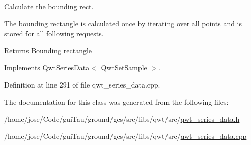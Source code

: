 Calculate the bounding rect. 

The bounding rectangle is calculated once by iterating over all points and is stored for all following requests.

\begin{DoxyReturn}{Returns}
Bounding rectangle 
\end{DoxyReturn}


Implements \hyperlink{class_qwt_series_data_aedb969ba51a27d88d26ad7f7cb1c2c7f}{Qwt\-Series\-Data$<$ Qwt\-Set\-Sample $>$}.



Definition at line 291 of file qwt\-\_\-series\-\_\-data.\-cpp.



The documentation for this class was generated from the following files\-:\begin{DoxyCompactItemize}
\item 
/home/jose/\-Code/gui\-Tau/ground/gcs/src/libs/qwt/src/\hyperlink{qwt__series__data_8h}{qwt\-\_\-series\-\_\-data.\-h}\item 
/home/jose/\-Code/gui\-Tau/ground/gcs/src/libs/qwt/src/\hyperlink{qwt__series__data_8cpp}{qwt\-\_\-series\-\_\-data.\-cpp}\end{DoxyCompactItemize}
